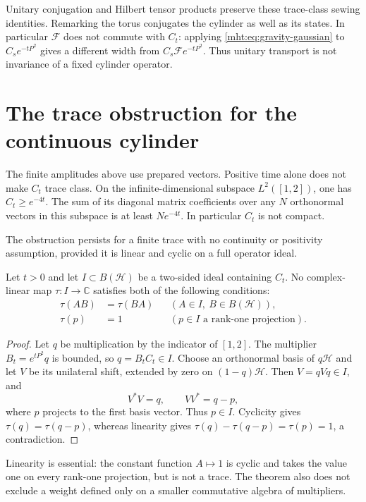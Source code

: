 Unitary conjugation and Hilbert tensor products preserve these
trace-class sewing identities. Remarking the torus conjugates the
cylinder as well as its states. In particular $\mathcal F$ does not
commute with $C_t$: applying \eqref{mht:eq:gravity-gaussian} to
$C_s e^{-tP^2}$ gives a different width from
$C_s\mathcal F e^{-tP^2}$. Thus unitary transport is not invariance
of a fixed cylinder operator.

\section{The trace obstruction for the continuous cylinder}

The finite amplitudes above use prepared vectors. Positive time alone
does not make $C_t$ trace class. On the infinite-dimensional subspace
$L^2([1,2])$, one has $C_t\geq e^{-4t}$. The sum of its diagonal
matrix coefficients over any $N$ orthonormal vectors in this subspace
is at least $Ne^{-4t}$. In particular $C_t$ is not compact.

The obstruction persists for a finite trace with no continuity or
positivity assumption, provided it is linear and cyclic on a full
operator ideal.

\begin{theorem}\label{mht:thm:gravity-no-finite-trace}
Let $t>0$ and let $I\subset B(\mathcal H)$ be a two-sided ideal
containing $C_t$. No complex-linear map $\tau:I\to\mathbb C$
satisfies both of the following conditions:
\[
 \begin{aligned}
 \tau(AB)&=\tau(BA)&& (A\in I,\ B\in B(\mathcal H)),\\
 \tau(p)&=1&& (p\in I\text{ a rank-one projection}).
 \end{aligned}
\]
\end{theorem}

\begin{proof}
Let $q$ be multiplication by the indicator of $[1,2]$.
The multiplier $B_t=e^{tP^2}q$ is bounded, so $q=B_tC_t\in I$.
Choose an orthonormal basis of $q\mathcal H$ and let $V$ be its
unilateral shift, extended by zero on $(1-q)\mathcal H$.
Then $V=qVq\in I$, and
\[
 V^*V=q,\qquad VV^*=q-p,
\]
where $p$ projects to the first basis vector. Thus $p\in I$.
Cyclicity gives $\tau(q)=\tau(q-p)$, whereas linearity gives
$\tau(q)-\tau(q-p)=\tau(p)=1$, a contradiction.
\end{proof}

Linearity is essential: the constant function $A\mapsto1$ is cyclic
and takes the value one on every rank-one projection, but is not a
trace. The theorem also does not exclude a weight defined only on a
smaller commutative algebra of multipliers.

